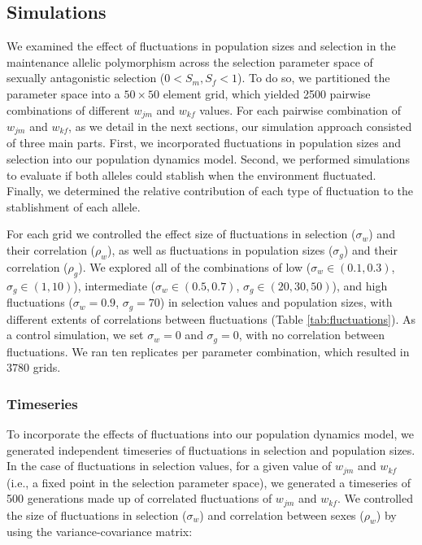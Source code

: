 \documentclass[12pt]{article}
\begin{document}
\subsection*{Simulations}

We examined the effect of fluctuations in population sizes and selection in the maintenance allelic polymorphism across the selection parameter space of sexually antagonistic selection ($0 < S_{m}, S_{f} < 1$). To do so, we partitioned the parameter space into a $50 \times 50$ element grid, which yielded 2500 pairwise combinations of different $w_{jm}$ and $w_{kf}$ values. For each pairwise combination of $w_{jm}$ and $w_{kf}$, as we detail in the next sections, our simulation approach consisted of three main parts. First, we incorporated fluctuations in population sizes and selection into our population dynamics model. Second, we performed simulations to evaluate if both alleles could stablish when the environment fluctuated. Finally, we determined the relative contribution of each type of fluctuation to the stablishment of each allele.

For each grid we controlled the effect size of  fluctuations in selection ($\sigma_{w}$) and their correlation ($\rho_{w}$), as well as fluctuations in population sizes ($\sigma_{g}$) and their correlation ($\rho_{g}$). We explored all of  the combinations of low ($\sigma_{w}\in{(0.1, 0.3)}$, $\sigma_{g}\in{(1,10)}$), intermediate ($\sigma_{w}\in{(0.5, 0.7)}$, $\sigma_{g}\in{(20,30,50)}$), and high fluctuations ($\sigma_{w}= 0.9$, $\sigma_{g}=70$)  in selection values and population sizes, with different extents of correlations between fluctuations (Table \ref{tab:fluctuations}).  As a control simulation, we set $\sigma_{w}= 0$ and  $\sigma_{g}=0$, with no correlation between fluctuations. We ran ten replicates per parameter combination, which resulted in 3780 grids.

\subsubsection*{Timeseries}


To incorporate the effects of fluctuations into our population dynamics model, we generated independent timeseries of fluctuations in selection and population sizes. In the case of fluctuations in selection values, for a given value of $w_{jm}$ and $w_{kf}$ (i.e., a fixed point in the selection parameter space), we generated a timeseries of 500 generations made up of correlated fluctuations of $w_{jm}$ and $w_{kf}$. We controlled the size of  fluctuations in selection ($\sigma_{w}$) and correlation between sexes ($\rho_{w}$) by  using the variance-covariance matrix:
\end{document}
